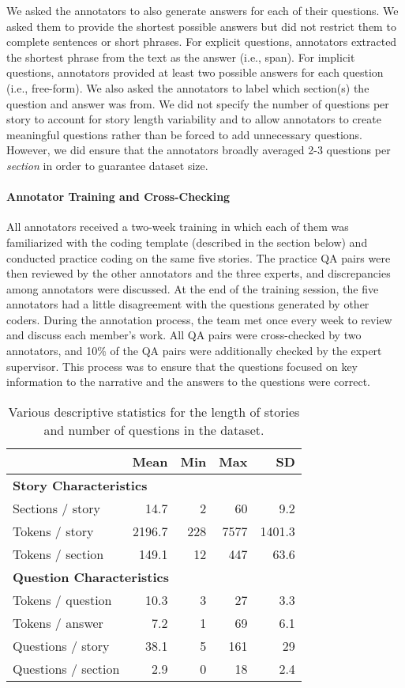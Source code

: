 \documentclass[11pt]{article}
\begin{document}
We asked the annotators to also generate answers for each of their questions. We asked them to provide the shortest possible answers but did not restrict them to complete sentences or short phrases. For explicit questions, annotators extracted the shortest phrase from the text as the answer (i.e., span). For implicit questions, annotators provided at least two possible answers for each question (i.e., free-form). We also asked the annotators to label which section(s) the question and answer was from. We did not specify the number of questions per story to account for story length variability and to allow annotators to create meaningful questions rather than be forced to add unnecessary questions. However, we did ensure that the annotators broadly averaged 2-3 questions per \textit{section} in order to guarantee dataset size.

\paragraph{Annotator Training and Cross-Checking}
All annotators received a two-week training in which each of them was familiarized with the coding template (described in the section below) and conducted practice coding on the same five stories. The practice QA pairs were then reviewed by the other annotators and the three experts, and discrepancies among annotators were discussed. At the end of the training session, the five annotators had a little disagreement with the questions generated by other coders. During the annotation process, the team met once every week to review and discuss each member’s work. All QA pairs were cross-checked by two annotators, and 10\% of the QA pairs were additionally checked by the expert supervisor. This process was to ensure that the questions focused on key information to the narrative and the answers to the questions were correct. 

\begin{table}[]
\centering
\small
\begin{tabular}{lrrrr}
\toprule
& \textbf{Mean} & \textbf{Min} & \textbf{Max}  & \textbf{SD}    \\ \midrule\midrule
\multicolumn{5}{l}{\textbf{Story Characteristics}}          \\
Sections / story    & 14.7   & 2   & 60   & 9.2  \\
Tokens / story      & 2196.7 & 228 & 7577 & 1401.3  \\
Tokens / section    & 149.1   & 12  & 447  & 63.6 \\ \midrule
\multicolumn{5}{l}{\textbf{Question Characteristics}}          \\
Tokens / question   & 10.3   & 3   & 27   & 3.3  \\
Tokens / answer     & 7.2    & 1   & 69   & 6.1  \\
Questions / story   & 38.1   & 5   & 161  & 29    \\
Questions / section & 2.9    & 0   & 18   & 2.4  \\
\bottomrule
\end{tabular}
\caption{\small{Various descriptive statistics for the length of stories and number of questions in the dataset.}}
\label{tab:data_stats}
\end{table}
\end{document}
